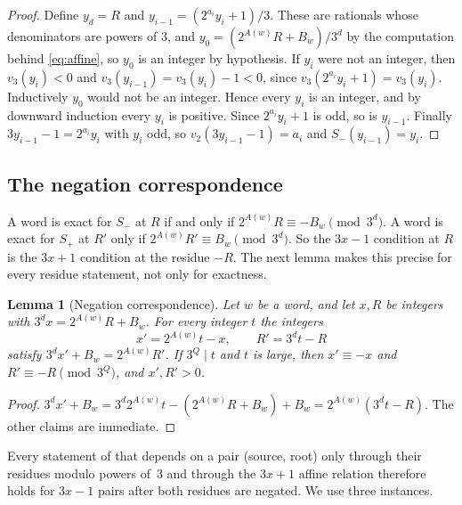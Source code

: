 \documentclass[11pt]{amsart}
\newtheorem{lemma}[theorem]{Lemma}
\theoremstyle{definition}
\theoremstyle{remark}
\newcommand{\Sp}{S_{+}}
\newcommand{\Sm}{S_{-}}
\begin{document}
\begin{proof}
Define $y_d=R$ and $y_{i-1}=(2^{a_i}y_i+1)/3$. These are rationals whose denominators are powers
of $3$, and $y_0=(2^{A(w)}R+B_w)/3^{d}$ by the computation behind \eqref{eq:affine}, so $y_0$ is an
integer by hypothesis. If $y_i$ were not an integer, then $v_3(y_i)<0$ and
$v_3(y_{i-1})=v_3(y_i)-1<0$, since $v_3(2^{a_i}y_i+1)=v_3(y_i)$. Inductively $y_0$ would not be
an integer. Hence every $y_i$ is an integer, and by downward induction every $y_i$ is positive.
Since $2^{a_i}y_i+1$ is odd, so is $y_{i-1}$. Finally $3y_{i-1}-1=2^{a_i}y_i$ with $y_i$ odd, so
$v_2(3y_{i-1}-1)=a_i$ and $\Sm(y_{i-1})=y_i$.
\end{proof}

\subsection{The negation correspondence}
A word is exact for $\Sm$ at $R$ if and only if $2^{A(w)}R\equiv-B_w\pmod{3^{d}}$. A word is exact
for $\Sp$ at $R'$ only if $2^{A(w)}R'\equiv B_w\pmod{3^{d}}$. So the $3x-1$ condition at $R$ is the
$3x+1$ condition at the residue $-R$. The next lemma makes this precise for every residue
statement, not only for exactness.

\begin{lemma}[Negation correspondence]\label{lem:neg-correspondence}
Let $w$ be a word, and let $x,R$ be integers with $3^{d}x=2^{A(w)}R+B_w$. For every integer $t$
the integers
\[
  x'=2^{A(w)}t-x,\qquad R'=3^{d}t-R
\]
satisfy $3^{d}x'+B_w=2^{A(w)}R'$. If $3^{Q}\mid t$ and $t$ is large, then $x'\equiv-x$ and
$R'\equiv-R\pmod{3^{Q}}$, and $x',R'>0$.
\end{lemma}

\begin{proof}
$3^{d}x'+B_w=3^{d}2^{A(w)}t-(2^{A(w)}R+B_w)+B_w=2^{A(w)}(3^{d}t-R)$. The other claims are
immediate.
\end{proof}

Every statement of \cite{MazurM1,MazurM2} that depends on a pair (source, root) only through their
residues modulo powers of~$3$ and through the $3x+1$ affine relation therefore holds for
$3x-1$ pairs after both residues are negated. We use three instances.
\end{document}
